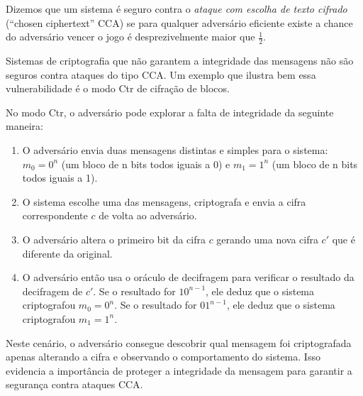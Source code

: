 \begin{center}
\end{center}

Dizemos que um sistema é seguro contra o {\em ataque com escolha de texto cifrado} (``chosen ciphertext'' CCA) se para qualquer adversário eficiente existe a chance do adversário vencer o jogo é desprezivelmente maior que $\frac{1}{2}$.

Sistemas de criptografia que não garantem a integridade das mensagens não são seguros contra ataques do tipo CCA.
Um exemplo que ilustra bem essa vulnerabilidade é o modo Ctr de cifração de blocos.

No modo Ctr, o adversário pode explorar a falta de integridade da seguinte maneira:
\begin{enumerate}
\item  O adversário  envia duas mensagens distintas e simples para o sistema: 
$m_0 = 0^n$ (um bloco de n bits todos iguais a 0) e $m_1 = 1^n$ (um bloco de n bits todos iguais a 1).
\item O sistema escolhe uma das mensagens, criptografa e envia a cifra correspondente $c$ de volta ao adversário.
\item O adversário altera o primeiro bit da cifra $c$ gerando uma nova cifra $c'$ que é diferente da original.
\item O adversário então usa o oráculo de decifragem para verificar o resultado da decifragem de $c'$.
  Se o resultado for $10^{n-1}$, ele deduz que o sistema criptografou $m_0 = 0^n$.
  Se o resultado for $01^{n-1}$, ele deduz que o sistema criptografou $m_1 = 1^n$.
  ​\end{enumerate}

Neste cenário, o adversário consegue descobrir qual mensagem foi criptografada apenas alterando a cifra e observando o comportamento do sistema.
Isso evidencia a importância de proteger a integridade da mensagem para garantir a segurança contra ataques CCA.

